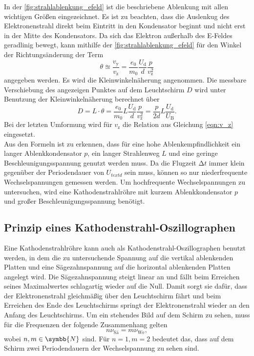     \noindent In der \autoref{fig:strahlablenkung_efeld} ist die beschriebene Ablenkung mit allen wichtigen Größen eingezeichnet. Es ist zu beachten, dass die Auslenkug
    des Elektronenstrahl direkt beim Eintritt in den Kondensator beginnt und nicht erst in der Mitte des Kondensators. Da sich das Elektron außerhalb des E-Feldes 
    geradlinig bewegt, kann mithilfe der \autoref{fig:strahlablenkung_efeld} für den Winkel der Richtungsänderung der Term 
    \begin{equation*}
        \theta \approxeq \frac{v_{\text{y}}}{v_{\text{z}}} = \frac{e_0}{m_0} \frac{U_{\text{d}}}{d} \frac{p}{v_{\text{z}}^2}
    \end{equation*}
    angegeben werden. Es wird die Kleinwinkelnäherung angenommen. Die messbare Verschiebung des angezeigen Punktes auf dem Leuchtschirm $D$ wird unter Benutzung der Kleinwinkelnäherung
    berechnet über
    \begin{equation}
        \label{eqn:pL_2d}
        D = L \cdot \theta = \frac{e_0}{m_0} L \frac{U_{\text{d}}}{d} \frac{p}{v_{\text{z}}^2} = \frac{p}{2d} L \frac{U_{\text{d}}}{U_{\text{B}}}. 
    \end{equation}
    Bei der letzten Umformung wird für $v_{\text{z}}$ die Relation aus Gleichung \eqref{eqn:v_z} eingesetzt. \\

    \noindent Aus den Formeln ist zu erkennen, dass für eine hohe Ablenkempfindlichkeit ein langer Ablenkkondensator $p$, ein langer Strahlenweg $L$ und eine geringe Beschleunigungsspannung 
    genutzt werden muss. Da die Flugzeit $\increment t$ immer klein gegenüber der Periodendauer von $U_{text{d}}$ sein muss, können so nur niederfrequente Wechselspannungen gemessen
    werden. Um hochfrequente Wechselspannungen zu untersuchen, wird eine Kathodenstrahlröhre mit  kurzem Ablenkkondensator $p$ und großer Beschleunigungsspannung benötigt.

\subsection{Prinzip eines Kathodenstrahl-Oszillographen}

    Eine Kathodenstrahlröhre kann auch als Kathodenstrahl-Oszillographen benutzt werden, in dem die zu untersuchende Spannung auf die vertikal ablenkenden Platten und eine Sägezahnspannung 
    auf die horizontal ablenkenden Platten angelegt wird. Die Sägezahnspannung steigt linear an und fällt beim Erreichen seines Maximalwertes schlagartig wieder auf die Null. 
    Damit sorgt sie dafür, dass der Elektronenstrahl gleichmäßig über den Leuchtschirm fährt und beim Erreichen des Ende des Leuchtschirms springt der Elektronenstrahl wieder an
    den Anfang des Leuchtschirms. Um ein stehendes Bild auf dem Schirm zu sehen, muss für die Frequenzen der folgende Zusammenhang gelten
    \begin{equation}\label{eqn:frequenzen}
        n \nu_{\text{Sä}} = m \nu_{\text{We}},
    \end{equation}
    wobei $n,m \in \symbb{N}$ sind. Für $n=1, m=2$ bedeutet das, dass auf dem Schirm zwei Periodendauern der Wechselspannung zu sehen sind.


